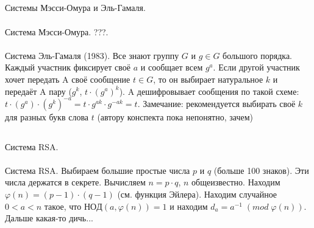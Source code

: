 \documentclass[a4paper,10pt]{article} %
\begin{document}
	\subsection{}
	Системы Мэсси-Омура и Эль-Гамаля.
	\\\\
	Система Мэсси-Омура. ???.
	\\\\
	Система Эль-Гамаля (1983). Все знают группу $G$ и $g \in G$ большого порядка.
	Каждый участник фиксирует своё $a$ и сообщает всем $g^{a}$. Если другой участник хочет передать A своё сообщение $t \in G$, то он выбирает натуральное $k$ и передаёт A пару ($g^{k}$, $t \cdot (g^{a})^{k}$). A дешифровывает сообщения по такой схеме: $t \cdot (g^{a}) \cdot (g^{k})^{-a} = t \cdot g^{ak} \cdot g^{-ak} = t$. Замечание: рекомендуется выбирать своё $k$ для разных букв слова $t$ (автору конспекта пока непонятно, зачем)
	\subsection{}
	Система RSA. 
	\\\\
	Система RSA. Выбираем большие простые числа $p$ и $q$ (больше 100 знаков). Эти числа держатся в секрете. Вычисляем $n = p \cdot q$, $n$ общеизвестно. Находим $\varphi(n) = (p - 1) \cdot (q - 1)$ (см. функция Эйлера). Находим случайное $0 < a < n$ такое, что $НОД(a, \varphi(n)) = 1$ и находим $d_{a} = a^{-1} \; (mod \; \varphi(n))$. Дальше какая-то дичь...
\end{document}
